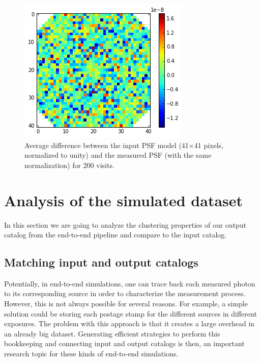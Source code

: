 \documentclass[\docopts]{\docclass}
\begin{document}
\begin{figure}
\centering
\includegraphics[width=0.9\columnwidth]{psf_residual.png}
\caption{Average difference between the input PSF model (41$\times$41 pixels, normalized to unity) and the measured PSF (with the same normalization) for 200 visits.}
\label{fig:psf_residual}
\end{figure}
\section{Analysis of the simulated dataset}
\label{sec:analysis}
In this section we are going to analyze the clustering properties of our output catalog from the end-to-end pipeline and compare to the input catalog.

\subsection{Matching input and output catalogs}
\label{sec:matching}

Potentially, in end-to-end simulations, one can trace back each measured photon to its corresponding source in order to characterize the measurement process. However, this is not always possible for several reasons. For example, a simple solution could be storing each postage stamp for the different sources in different exposures. The problem with this approach is that it creates a large overhead in an already big dataset. Generating efficient strategies to perform this bookkeeping and connecting input and output catalogs is then, an important research topic for these kinds of end-to-end simulations. 
\end{document}
